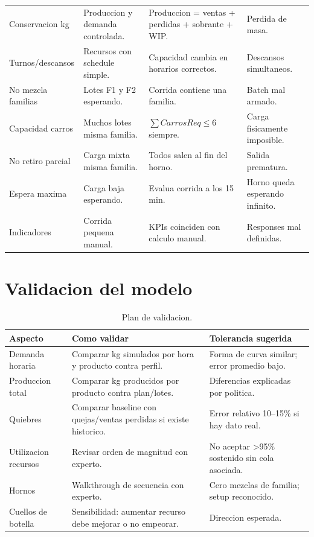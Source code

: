\documentclass[11pt]{article}
\begin{document}
\begin{longtable}{L{3.3cm}L{3.6cm}L{4.0cm}L{4.0cm}}
Conservacion kg & Produccion y demanda controlada. & Produccion = ventas + perdidas + sobrante + WIP. & Perdida de masa. \\
Turnos/descansos & Recursos con schedule simple. & Capacidad cambia en horarios correctos. & Descansos simultaneos. \\
No mezcla familias & Lotes F1 y F2 esperando. & Corrida contiene una familia. & Batch mal armado. \\
Capacidad carros & Muchos lotes misma familia. & \(\sum CarrosReq \leq 6\) siempre. & Carga fisicamente imposible. \\
No retiro parcial & Carga mixta misma familia. & Todos salen al fin del horno. & Salida prematura. \\
Espera maxima & Carga baja esperando. & Evalua corrida a los 15 min. & Horno queda esperando infinito. \\
Indicadores & Corrida pequena manual. & KPIs coinciden con calculo manual. & Responses mal definidas. \\
\bottomrule
\end{longtable}
\normalsize

\section{Validacion del modelo}

\begin{table}[H]
\centering
\caption{Plan de validacion.}
\begin{tabularx}{\textwidth}{L{3.7cm}Y Y}
\toprule
{}
\color{white}Aspecto & \color{white}Como validar & \color{white}Tolerancia sugerida \\
\midrule
Demanda horaria & Comparar kg simulados por hora y producto contra perfil. & Forma de curva similar; error promedio bajo. \\
Produccion total & Comparar kg producidos por producto contra plan/lotes. & Diferencias explicadas por politica. \\
Quiebres & Comparar baseline con quejas/ventas perdidas si existe historico. & Error relativo 10--15\% si hay dato real. \\
Utilizacion recursos & Revisar orden de magnitud con experto. & No aceptar >95\% sostenido sin cola asociada. \\
Hornos & Walkthrough de secuencia con experto. & Cero mezclas de familia; setup reconocido. \\
Cuellos de botella & Sensibilidad: aumentar recurso debe mejorar o no empeorar. & Direccion esperada. \\
\bottomrule
\end{tabularx}
\end{table}
\end{document}
